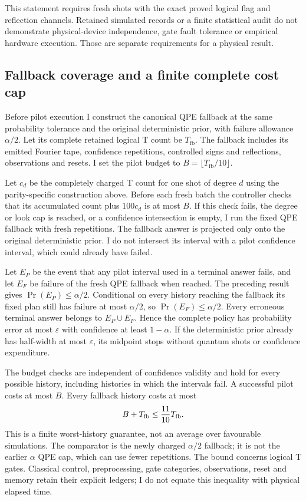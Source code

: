 \documentclass[11pt]{article}
\begin{document}
This statement requires fresh shots with the exact proved logical flag
and reflection channels. Retained simulated records or a finite
statistical audit do not demonstrate physical-device independence, gate
fault tolerance or empirical hardware execution. Those are separate
requirements for a physical result.

\subsection{Fallback coverage and a finite complete cost cap}

Before pilot execution I construct the canonical QPE fallback at the
same probability tolerance and the original deterministic prior, with
failure allowance $\alpha/2$. Let its complete retained logical T count
be $T_{\mathrm{fb}}$. The fallback includes its emitted Fourier tape,
confidence repetitions, controlled signs and reflections, observations
and resets. I set the pilot budget to
$B=\lfloor T_{\mathrm{fb}}/10\rfloor$.

Let $c_d$ be the completely charged T count for one shot of degree $d$
using the parity-specific construction above. Before each fresh batch
the controller checks that its accumulated count plus $100c_d$ is at
most $B$. If this check fails, the degree or look cap is reached, or a
confidence intersection is empty, I run the fixed QPE fallback with
fresh repetitions. The fallback answer is projected only onto the
original deterministic prior. I do not intersect its interval with a
pilot confidence interval, which could already have failed.

Let $E_P$ be the event that any pilot interval used in a terminal answer
fails, and let $E_F$ be failure of the fresh QPE fallback when reached.
The preceding result gives $\Pr(E_P)\leq\alpha/2$. Conditional on every
history reaching the fallback its fixed plan still has failure at most
$\alpha/2$, so $\Pr(E_F)\leq\alpha/2$. Every erroneous terminal answer
belongs to $E_P\cup E_F$. Hence the complete policy has probability
error at most $\varepsilon$ with confidence at least $1-\alpha$.
If the deterministic prior already has half-width at most
$\varepsilon$, its midpoint stops without quantum shots or confidence
expenditure.

The budget checks are independent of confidence validity and hold for
every possible history, including histories in which the intervals
fail. A successful pilot costs at most $B$. Every fallback history costs
at most
\[
 B+T_{\mathrm{fb}}\leq{11\over10}T_{\mathrm{fb}}.
\]
This is a finite worst-history guarantee, not an average over favourable
simulations. The comparator is the newly charged $\alpha/2$ fallback;
it is not the earlier $\alpha$ QPE cap, which can use fewer repetitions.
The bound concerns logical T gates. Classical control, preprocessing,
gate categories, observations, reset and memory retain their explicit
ledgers; I do not equate this inequality with physical elapsed time.
\end{document}
